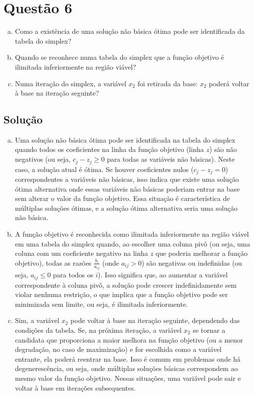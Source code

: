 \documentclass{article}
\begin{document}
\section{Questão 6}


\begin{enumerate}[(a)]
    \item Como a existência de uma solução não básica ótima pode ser identificada da tabela do simplex?
    \item Quando se reconhece numa tabela do simplex que a função objetivo é ilimitada inferiormente na região viável?
    \item Numa iteração do simplex, a variável $x_2$ foi retirada da base: $x_2$ poderá voltar à base na iteração seguinte?
\end{enumerate}

\subsection{Solução}

\begin{enumerate}[(a)]
  \item Uma solução não básica ótima pode ser identificada na tabela do simplex quando todos os coeficientes na linha da função objetivo (linha \( z \)) são não negativos (ou seja, \( c_j - z_j \geq 0 \) para todas as variáveis não básicas). Neste caso, a solução atual é ótima. Se houver coeficientes nulos (\( c_j - z_j = 0 \)) correspondentes a variáveis não básicas, isso indica que existe uma solução ótima alternativa onde essas variáveis não básicas poderiam entrar na base sem alterar o valor da função objetivo. Essa situação é característica de múltiplas soluções ótimas, e a solução ótima alternativa seria uma solução não básica.
  \item A função objetivo é reconhecida como ilimitada inferiormente na região viável em uma tabela do simplex quando, ao escolher uma coluna pivô (ou seja, uma coluna com um coeficiente negativo na linha \( z \) que poderia melhorar a função objetivo), todas as razões \( \frac{b_i}{a_{ij}} \) (onde \( a_{ij} > 0 \)) são negativas ou indefinidas (ou seja, \( a_{ij} \leq 0 \) para todos os \( i \)). Isso significa que, ao aumentar a variável correspondente à coluna pivô, a solução pode crescer indefinidamente sem violar nenhuma restrição, o que implica que a função objetivo pode ser minimizada sem limite, ou seja, é ilimitada inferiormente.
  \item Sim, a variável \( x_2 \) pode voltar à base na iteração seguinte, dependendo das condições da tabela. Se, na próxima iteração, a variável \( x_2 \) se tornar a candidata que proporciona a maior melhora na função objetivo (ou a menor degradação, no caso de maximização) e for escolhida como a variável entrante, ela poderá reentrar na base. Isso é comum em problemas onde há degenerescência, ou seja, onde múltiplas soluções básicas correspondem ao mesmo valor da função objetivo. Nessas situações, uma variável pode sair e voltar à base em iterações subsequentes.
\end{enumerate}
\end{document}
